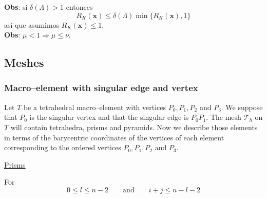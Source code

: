 \textbf{Obs}: si $\delta(\Lambda)>1$ entonces
\[
  R_K(\textbf{x}) \leqslant \delta(\Lambda)\min\{ R_K(\textbf{x}), 1\}
\]
as\'i que asumimos $R_K(\textbf{x})\leqslant 1$.\\[7pt]
\textbf{Obs}: $\mu < 1 \Rightarrow \mu \leqslant \nu$. \\[7pt]



\subsection{Meshes}\label{meshes}
\subsubsection{Macro--element with singular edge and vertex}\label{caso4}
Let $T$ be a tetrahedral macro--element with vertices $P_0, P_1, P_2$ and $P_3$. We suppose that $P_0$ is the singular vertex and that the
singular edge is $P_0P_1$. The mesh $\mathcal T_h$ on $T$ will contain tetrahedra, prisms and pyramids. Now we describe those elements in terms
of the barycentric coordinates of the vertices of each element corresponding to the ordered vertices $P_0, P_1, P_2$ and $P_3$.
\bigskip

\underline{Prisms}

For 
\[
0\le l\le n-2 \qquad\mbox{and}\qquad i+j\le n-l-2
\]

